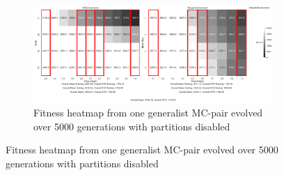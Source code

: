         \begin{figure}[!ht]
            \centering
            \begin{subfigure}{\textwidth}
                \centering
                \includegraphics[width=\linewidth]{./resources/generalist_4_2784/fitness_heatmap.png}
                \caption{Fitness heatmap from one generalist MC-pair evolved over 5000 generations with partitions disabled}
                \label{fig:fit_heat_generalist}
            \end{subfigure}


\end{figure}
